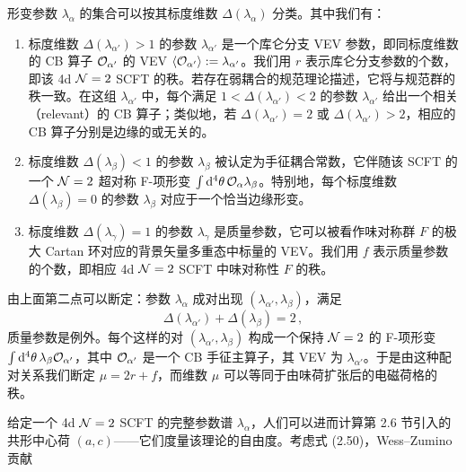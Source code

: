 形变参数 $\lambda_{\alpha}$ 的集合可以按其标度维数 $\Delta(\lambda_{\alpha})$ 分类。其中我们有：
\begin{enumerate}[label=\arabic*.,leftmargin=2.2em,itemsep=5pt,topsep=4pt]
  \item 标度维数 $\Delta(\lambda_{\alpha'})>1$ 的参数 $\lambda_{\alpha'}$ 是一个库仑分支 VEV 参数，即同标度维数的 CB 算子 $\mathcal{O}_{\alpha'}$ 的 VEV $\langle\mathcal{O}_{\alpha'}\rangle:=\lambda_{\alpha'}$。我们用 $r$ 表示库仑分支参数的个数，即该 4d $\mathcal{N}=2$ SCFT 的秩。若存在弱耦合的规范理论描述，它将与规范群的秩一致。在这组 $\lambda_{\alpha'}$ 中，每个满足 $1<\Delta(\lambda_{\alpha'})<2$ 的参数 $\lambda_{\alpha'}$ 给出一个相关（relevant）的 CB 算子；类似地，若 $\Delta(\lambda_{\alpha'})=2$ 或 $\Delta(\lambda_{\alpha'})>2$，相应的 CB 算子分别是边缘的或无关的。
  \item 标度维数 $\Delta(\lambda_{\beta})<1$ 的参数 $\lambda_{\beta}$ 被认定为手征耦合常数，它伴随该 SCFT 的一个 $\mathcal{N}=2$ 超对称 F-项形变 $\int \mathrm{d}^4\theta\,\mathcal{O}_{\alpha}\lambda_{\beta}$。特别地，每个标度维数 $\Delta(\lambda_{\beta})=0$ 的参数 $\lambda_{\beta}$ 对应于一个恰当边缘形变。
  \item 标度维数 $\Delta(\lambda_{\gamma})=1$ 的参数 $\lambda_{\gamma}$ 是质量参数，它可以被看作味对称群 $F$ 的极大 Cartan 环对应的背景矢量多重态中标量的 VEV。我们用 $f$ 表示质量参数的个数，即相应 4d $\mathcal{N}=2$ SCFT 中味对称性 $F$ 的秩。
\end{enumerate}

由上面第二点可以断定：参数 $\lambda_{\alpha}$ 成对出现 $(\lambda_{\alpha'},\lambda_{\beta})$，满足
\begin{equation}
  \Delta(\lambda_{\alpha'})+\Delta(\lambda_{\beta}) = 2\,,
  \tag{5.17}
\end{equation}
质量参数是例外。每个这样的对 $(\lambda_{\alpha'},\lambda_{\beta})$ 构成一个保持 $\mathcal{N}=2$ 的 F-项形变 $\int\mathrm{d}^4\theta\,\lambda_{\beta}\mathcal{O}_{\alpha'}$，其中 $\mathcal{O}_{\alpha'}$ 是一个 CB 手征主算子，其 VEV 为 $\lambda_{\alpha'}$。于是由这种配对关系我们断定 $\mu=2r+f$，而维数 $\mu$ 可以等同于由味荷扩张后的电磁荷格的秩。


给定一个 4d $\mathcal{N}=2$ SCFT 的完整参数谱 $\lambda_{\alpha}$，人们可以进而计算第 2.6 节引入的共形中心荷 $(a,c)$——它们度量该理论的自由度。考虑式 (2.50)，Wess--Zumino 贡献


